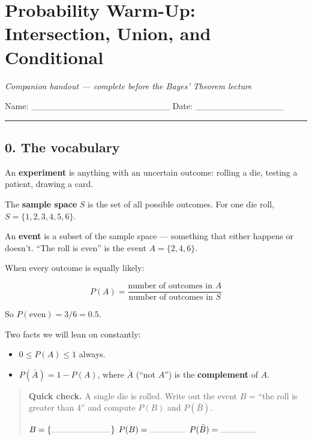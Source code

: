 \documentclass[
]{article}
\author{}
\date{}
\providecommand{\tightlist}{%
  \setlength{\itemsep}{0pt}\setlength{\parskip}{0pt}}
\begin{document}
\section{Probability Warm-Up: Intersection, Union, and
Conditional}\label{probability-warm-up-intersection-union-and-conditional}

\emph{Companion handout --- complete before the Bayes' Theorem lecture}

Name: \_\_\_\_\_\_\_\_\_\_\_\_\_\_\_\_\_\_\_\_\_\_ Date:
\_\_\_\_\_\_\_\_\_\_\_\_\_\_

\begin{center}\rule{0.5\linewidth}{0.5pt}\end{center}

\subsection{0. The vocabulary}\label{the-vocabulary}

An \textbf{experiment} is anything with an uncertain outcome: rolling a
die, testing a patient, drawing a card.

The \textbf{sample space} \(S\) is the set of all possible outcomes. For
one die roll, \(S = \{1,2,3,4,5,6\}\).

An \textbf{event} is a subset of the sample space --- something that
either happens or doesn't. ``The roll is even'' is the event
\(A = \{2,4,6\}\).

When every outcome is equally likely:

\[P(A) = \frac{\text{number of outcomes in } A}{\text{number of outcomes in } S}\]

So \(P(\text{even}) = 3/6 = 0.5\).

Two facts we will lean on constantly:

\begin{itemize}
\tightlist
\item
  \(0 \le P(A) \le 1\) always.
\item
  \(P(\bar{A}) = 1 - P(A)\), where \(\bar{A}\) (``not \(A\)'') is the
  \textbf{complement} of \(A\).
\end{itemize}

\begin{quote}
\textbf{Quick check.} A single die is rolled. Write out the event \(B\)
= ``the roll is greater than 4'' and compute \(P(B)\) and
\(P(\bar{B})\).

\(B = \{\rule{2.5cm}{0.15pt}\}\) \(P(B) = \rule{1.5cm}{0.15pt}\)
\(P(\bar{B}) = \rule{1.5cm}{0.15pt}\)
\end{quote}
\end{document}
